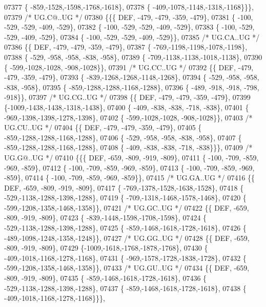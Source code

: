 \begin{DoxyCode}
07377 \{ -859,-1528,-1598,-1768,-1618\},
07378 \{ -409,-1078,-1148,-1318,-1168\}\}\},
07379 \textcolor{comment}{/* UG.C@..UG */}
07380 \{\{\{  DEF, -479, -479, -359, -479\},
07381 \{ -100, -529, -529, -409, -529\},
07382 \{ -100, -529, -529, -409, -529\},
07383 \{ -100, -529, -529, -409, -529\},
07384 \{ -100, -529, -529, -409, -529\}\},
07385 \textcolor{comment}{/* UG.CA..UG */}
07386 \{\{  DEF, -479, -479, -359, -479\},
07387 \{ -769,-1198,-1198,-1078,-1198\},
07388 \{ -529, -958, -958, -838, -958\},
07389 \{ -709,-1138,-1138,-1018,-1138\},
07390 \{ -599,-1028,-1028, -908,-1028\}\},
07391 \textcolor{comment}{/* UG.CC..UG */}
07392 \{\{  DEF, -479, -479, -359, -479\},
07393 \{ -839,-1268,-1268,-1148,-1268\},
07394 \{ -529, -958, -958, -838, -958\},
07395 \{ -859,-1288,-1288,-1168,-1288\},
07396 \{ -489, -918, -918, -798, -918\}\},
07397 \textcolor{comment}{/* UG.CG..UG */}
07398 \{\{  DEF, -479, -479, -359, -479\},
07399 \{-1009,-1438,-1438,-1318,-1438\},
07400 \{ -409, -838, -838, -718, -838\},
07401 \{ -969,-1398,-1398,-1278,-1398\},
07402 \{ -599,-1028,-1028, -908,-1028\}\},
07403 \textcolor{comment}{/* UG.CU..UG */}
07404 \{\{  DEF, -479, -479, -359, -479\},
07405 \{ -859,-1288,-1288,-1168,-1288\},
07406 \{ -529, -958, -958, -838, -958\},
07407 \{ -859,-1288,-1288,-1168,-1288\},
07408 \{ -409, -838, -838, -718, -838\}\}\},
07409 \textcolor{comment}{/* UG.G@..UG */}
07410 \{\{\{  DEF, -659, -809, -919, -809\},
07411 \{ -100, -709, -859, -969, -859\},
07412 \{ -100, -709, -859, -969, -859\},
07413 \{ -100, -709, -859, -969, -859\},
07414 \{ -100, -709, -859, -969, -859\}\},
07415 \textcolor{comment}{/* UG.GA..UG */}
07416 \{\{  DEF, -659, -809, -919, -809\},
07417 \{ -769,-1378,-1528,-1638,-1528\},
07418 \{ -529,-1138,-1288,-1398,-1288\},
07419 \{ -709,-1318,-1468,-1578,-1468\},
07420 \{ -599,-1208,-1358,-1468,-1358\}\},
07421 \textcolor{comment}{/* UG.GC..UG */}
07422 \{\{  DEF, -659, -809, -919, -809\},
07423 \{ -839,-1448,-1598,-1708,-1598\},
07424 \{ -529,-1138,-1288,-1398,-1288\},
07425 \{ -859,-1468,-1618,-1728,-1618\},
07426 \{ -489,-1098,-1248,-1358,-1248\}\},
07427 \textcolor{comment}{/* UG.GG..UG */}
07428 \{\{  DEF, -659, -809, -919, -809\},
07429 \{-1009,-1618,-1768,-1878,-1768\},
07430 \{ -409,-1018,-1168,-1278,-1168\},
07431 \{ -969,-1578,-1728,-1838,-1728\},
07432 \{ -599,-1208,-1358,-1468,-1358\}\},
07433 \textcolor{comment}{/* UG.GU..UG */}
07434 \{\{  DEF, -659, -809, -919, -809\},
07435 \{ -859,-1468,-1618,-1728,-1618\},
07436 \{ -529,-1138,-1288,-1398,-1288\},
07437 \{ -859,-1468,-1618,-1728,-1618\},
07438 \{ -409,-1018,-1168,-1278,-1168\}\}\},

\end{DoxyCode}
